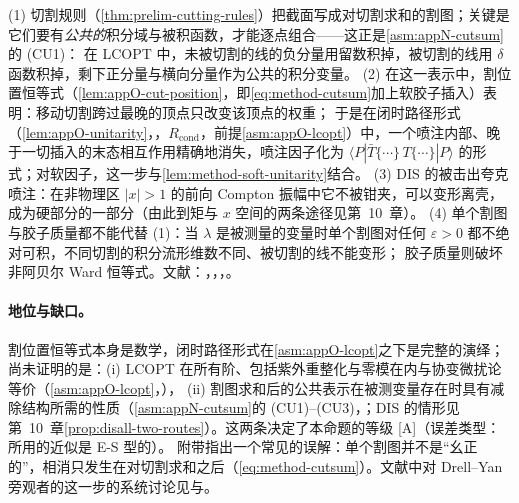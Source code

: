 \begin{proofsketch}
(1) 切割规则（\cref{thm:prelim-cutting-rules}）把截面写成对切割求和的割图；关键是它们要有\emph{公共的}积分域与被积函数，才能逐点组合——这正是\cref{asm:appN-cutsum}的 (CU1)：
在 LCOPT 中，未被切割的线的负分量用留数积掉，被切割的线用 $\delta$ 函数积掉，剩下正分量与横向分量作为公共的积分变量。
(2) 在这一表示中，割位置恒等式（\cref{lem:appO-cut-position}，即\cref{eq:method-cutsum}加上软胶子插入）表明：移动切割跨过最晚的顶点只改变该顶点的权重；
于是在闭时路径形式（\cref{lem:appO-unitarity}，\tagR，$R_{\mathrm{cond}}$，前提\cref{asm:appO-lcopt}）中，一个喷注内部、晚于一切插入的末态相互作用精确地消失，喷注因子化为
$\langle P|\bar T\{\cdots\}\,T\{\cdots\}|P\rangle$ 的形式；对软因子，这一步与\cref{lem:method-soft-unitarity}结合。
(3) DIS 的被击出夸克喷注：在非物理区 $|x|>1$ 的前向 Compton 振幅中它不被钳夹，可以变形离壳，成为硬部分的一部分（由此到矩与 $x$ 空间的两条途径见第~10~章）。
(4) 单个割图与胶子质量都不能代替 (1)：当 $\lambda$ 是被测量的变量时单个割图对任何 $\varepsilon>0$ 都不绝对可积，不同切割的积分流形维数不同、被切割的线不能变形；
胶子质量则破坏非阿贝尔 Ward 恒等式。文献：\cite{LibbySterman1978a}，\cite{CollinsSoperSterman1988}，\cite[第~14.4~节]{Collins2011}，\cite{AybatSterman2009}。
\end{proofsketch}

\paragraph{地位与缺口。}割位置恒等式本身是数学，闭时路径形式在\cref{asm:appO-lcopt}之下是完整的演绎；尚未证明的是：(i) LCOPT 在所有阶、包括紫外重整化与零模在内与协变微扰论等价（\cref{asm:appO-lcopt}，\tagA），
(ii) 割图求和后的公共表示在被测变量存在时具有减除结构所需的性质（\cref{asm:appN-cutsum}的 (CU1)--(CU3)，\tagA；DIS 的情形见第~10~章\cref{prop:disall-two-routes}）。这两条决定了本命题的等级 [A]（误差类型：所用的近似是 E-S 型的）。
附带指出一个常见的误解：单个割图并不是“幺正的”，相消只发生在对切割求和之后（\cref{eq:method-cutsum}）。文献中对 Drell--Yan 旁观者的这一步的系统讨论见\cite{CollinsSoperSterman1988}与\cite[第~14.4~节]{Collins2011}。

